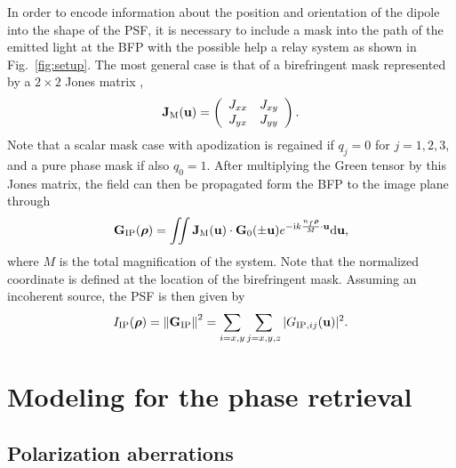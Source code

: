 \documentclass[reprint,aps,pra,superscriptaddress,
amsmath,amssymb]{revtex4-1}
\begin{document}
In order to encode information about the position and orientation of the 
dipole into the shape of the PSF, it is necessary to include a mask into the 
path of the emitted light at the BFP with the possible help a relay system 
as shown in Fig.~\ref{fig:setup}. 
The most general case is that of a 
birefringent mask represented by a $2\times 2$ Jones matrix \cite{},
\begin{align} \label{eq:jqw}
\textbf J_\text{M}(\textbf u) =  \left(
\begin{array}{cc}
J_{xx}&J_{xy} \\
J_{yx} & J_{yy}
\end{array}
\right).
\end{align}
Note that a scalar mask case with apodization is regained if $q_j=0$ 
for $j=1,2,3$, and a pure phase mask if also $q_0 =1$.
After multiplying the Green tensor by this Jones matrix, the field  can then 
be propagated form the BFP to the image plane through
\begin{align}
\textbf G_\text{IP} (\boldsymbol \rho ) = \iint  \textbf J_\text{M}(\textbf u)  
\cdot \textbf G_0  (\pm \textbf u) e^{- \text{i} k  \frac{n_f \boldsymbol \rho}{M}  \cdot \textbf u } \mathrm{d} \textbf u ,
\end{align}
where $M$ is the total magnification of the system. 
Note that the normalized coordinate is defined at the location of the birefringent  mask.
Assuming an incoherent source, the PSF is then given by
\begin{align}
  I_\text{IP} (\boldsymbol \rho) =  \left\lVert\textbf G_\text{IP} \right\rVert^2 
  = \sum_{i=x,y} \sum_{j=x,y,z} |G_{\text{IP},ij}( \textbf u)|^2.
\end{align}

\section{Modeling for the phase retrieval}

\subsection{Polarization aberrations}
\end{document}
